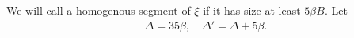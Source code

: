 \documentclass[12pt]{memoir}
\newcommand{\fld}[1]{\ensuremath{\textit{#1}}}
\def\B{B}
\newcommand{\D}{D}
\newcommand{\Plus}{\oplus}
\newcommand{\Minus}{\ominus}
\newcommand{\cRebd}{\fld{cRebd}}
\newcommand{\Core}{\fld{Core}}
\begin{document}






\begin{definition}\label{def:Delta}
We will call a homogenous segment of \( \xi \)  if it has size 
at least \( 5\beta\B \).
  Let
 \begin{align*}
 \Delta=35\beta,\quad \Delta'=\Delta+5\beta.
 \end{align*}
\end{definition}
\end{document}
